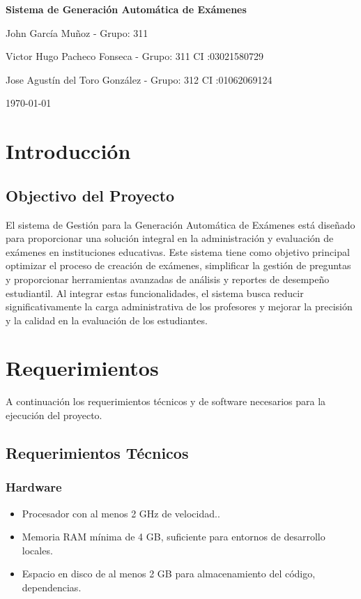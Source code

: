 \documentclass[a4paper,12pt]{article}
\begin{document}
\begin{titlepage}
    \centering
    \vspace{1in}
    {\Huge \bfseries Sistema de Generación Automática de Exámenes \par}
    \vspace{1.5in}
    {\Large John García Muñoz - Grupo: 311   \par}
    {\Large Victor Hugo Pacheco Fonseca - Grupo: 311 CI :03021580729 \par}
    {\Large Jose Agustín del Toro González - Grupo: 312 CI :01062069124 \par}
    \vfill
    {\Large \today \par}
\end{titlepage}

\tableofcontents
\newpage

\section{Introducción}

\subsection{Objectivo del Proyecto}
El sistema de Gestión para la Generación Automática de Exámenes está diseñado para proporcionar una solución integral en la administración y evaluación de exámenes en instituciones educativas. Este sistema tiene como objetivo principal optimizar el proceso de creación de exámenes, simplificar la gestión de preguntas y proporcionar herramientas avanzadas de análisis y reportes de desempeño estudiantil. Al integrar estas funcionalidades, el sistema busca reducir significativamente la carga administrativa de los profesores y mejorar la precisión y la calidad en la evaluación de los estudiantes.


\newpage
\section{Requerimientos}
A continuación los requerimientos técnicos y de software necesarios para la ejecución del proyecto.

\subsection{Requerimientos Técnicos}
\subsubsection{Hardware}
\begin{itemize}
	\item Procesador con al menos 2 GHz de velocidad..
	\item Memoria RAM mínima de 4 GB, suficiente para entornos de desarrollo
	locales.
	\item Espacio en disco de al menos 2 GB para almacenamiento del código,
	dependencias.
\end{itemize}
\end{document}
